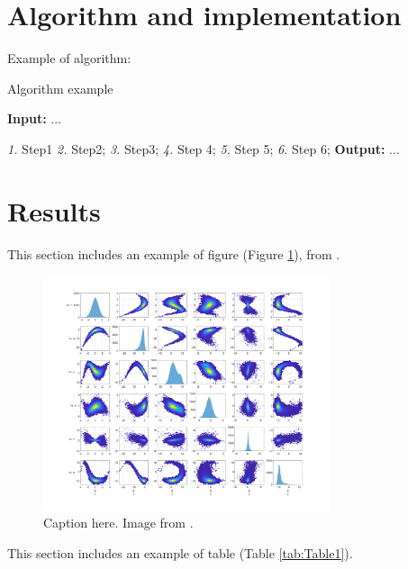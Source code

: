 \documentclass[a4paper,fleqn]{cas-sc}
\begin{document}
\section{Algorithm and implementation}

Example of algorithm:
\begin{algorithm}
  \caption{Algorithm example }
  
  \begin{algorithmic}
  \label{alg:Alg1}
  \State \textbf{Input:} ...
   \newline

 \Statex \textit{1.} Step1
  \Statex \textit{2.} Step2;
 \State \textit{3.}  Step3;
  \newline
   \State \textit{4.} Step 4;
   \State \textit{5.}  Step 5;
   \State \textit{6.} Step 6;
   \EndFor
  \EndFor 
  \newline
\State  \textbf{Output: } ... 
  \end{algorithmic} 
\end{algorithm} 


\section{Results}


This section includes an example of figure (Figure \ref{fig:Figure1}), from  \cite{de2021direct}.

\begin{figure}
\centering
\includegraphics[width=0.75\textwidth]{figs_rev1/uncond_distribution_reference.png}
\caption{ Caption here. Image from \cite{de2021direct}.}
\label{fig:Figure1}
\end{figure}

This section includes an example of table (Table \ref{tab:Table1}).
\end{document}

